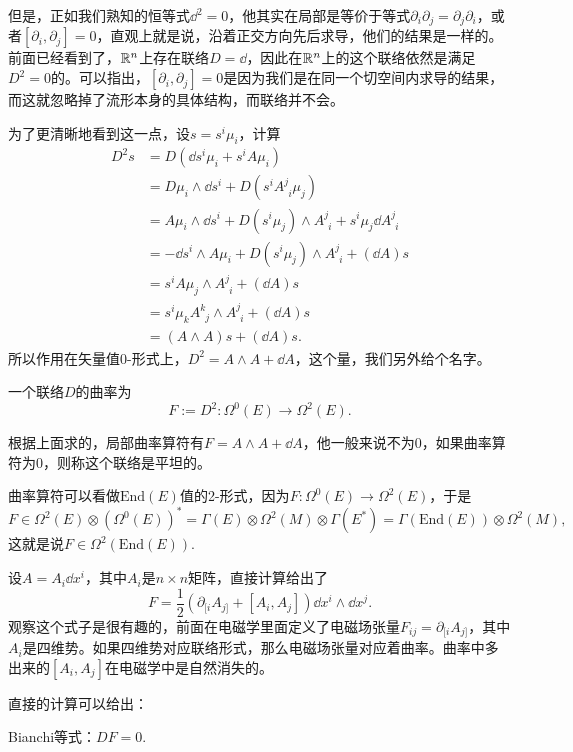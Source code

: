 但是，正如我们熟知的恒等式$\dd^2=0$，他其实在局部是等价于等式$\partial_i \partial_j=\partial_j \partial_i$，或者$[\partial_i,\partial_j]=0$，直观上就是说，沿着正交方向先后求导，他们的结果是一样的。前面已经看到了，$\mathbb{R}^n$上存在联络$D=\dd$，因此在$\mathbb{R}^n$上的这个联络依然是满足$D^2=0$的。可以指出，$[\partial_i,\partial_j]=0$是因为我们是在同一个切空间内求导的结果，而这就忽略掉了流形本身的具体结构，而联络并不会。

为了更清晰地看到这一点，设$s=s^i\mu_i$，计算
\begin{align*}
	D^2 s&=D(\dd s^i \mu_i+s^iA\mu_i)\\
	&=D\mu_i\wedge \dd s^i+D(s^i A^{j}_{\phantom{j}i}\mu_j)\\
	&=A\mu_i\wedge \dd s^i+D(s^i\mu_j)\wedge A^{j}_{\phantom{j}i}+s^i\mu_j\dd A^{j}_{\phantom{j}i}\\
	&=-\dd s^i\wedge A\mu_i+D(s^i\mu_j)\wedge A^{j}_{\phantom{j}i}+(\dd A)s\\
	&=s^i A\mu_j\wedge A^{j}_{\phantom{j}i}+(\dd A)s\\
	&=s^i \mu_k A^{k}_{\phantom{k}j}\wedge A^{j}_{\phantom{j}i}+(\dd A)s\\
	&=(A\wedge A)s+(\dd A)s.
\end{align*}
所以作用在矢量值0-形式上，$D^2=A\wedge A+\dd A$，这个量，我们另外给个名字。

\para 一个联络$D$的曲率为
\[
	F:=D^2:\Omega^0(E)\to \Omega^2(E).
\]

根据上面求的，局部曲率算符有$F=A\wedge A+\dd A$，他一般来说不为0，如果曲率算符为0，则称这个联络是平坦的。

曲率算符可以看做$\mathrm{End}(E)$值的2-形式，因为$F:\Omega^0(E)\to \Omega^2(E)$，于是
\[
	F\in \Omega^2(E)\otimes (\Omega^0(E))^*=\Gamma(E)\otimes \Omega^2(M)\otimes \Gamma(E^*)=\Gamma(\mathrm{End}(E))\otimes \Omega^2(M),
\]
这就是说$F\in \Omega^2(\mathrm{End}(E))$.

设$A=A_i\dd x^i$，其中$A_i$是$n\times n$矩阵，直接计算给出了
\[
	F=\frac{1}{2}\left(\partial_{[i}A_{j]}+[A_i,A_j]\right)\dd x^i\wedge \dd x^j.
\]
观察这个式子是很有趣的，前面在电磁学里面定义了电磁场张量$F_{ij}=\partial_{[i}A_{j]}$，其中$A_i$是四维势。如果四维势对应联络形式，那么电磁场张量对应着曲率。曲率中多出来的$[A_i,A_j]$在电磁学中是自然消失的。

直接的计算可以给出：

\pro Bianchi等式：$DF=0$.


